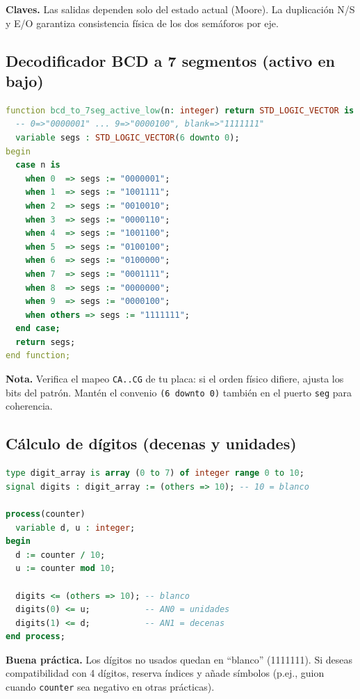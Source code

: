 \documentclass[a4paper,12pt]{article}
\begin{document}
\textbf{Claves.} Las salidas dependen solo del estado actual (Moore). La duplicación N/S y E/O garantiza consistencia física de los dos semáforos por eje.


\subsection{Decodificador BCD a 7 segmentos (activo en bajo)}

\begin{lstlisting}[language=VHDL, caption={Función BCD a 7-seg activo en bajo}, label={lst:decoder-7seg}]
function bcd_to_7seg_active_low(n: integer) return STD_LOGIC_VECTOR is
  -- 0=>"0000001" ... 9=>"0000100", blank=>"1111111"
  variable segs : STD_LOGIC_VECTOR(6 downto 0);
begin
  case n is
    when 0  => segs := "0000001";
    when 1  => segs := "1001111";
    when 2  => segs := "0010010";
    when 3  => segs := "0000110";
    when 4  => segs := "1001100";
    when 5  => segs := "0100100";
    when 6  => segs := "0100000";
    when 7  => segs := "0001111";
    when 8  => segs := "0000000";
    when 9  => segs := "0000100";
    when others => segs := "1111111";
  end case;
  return segs;
end function;
\end{lstlisting}

\textbf{Nota.} Verifica el mapeo \texttt{CA..CG} de tu placa: si el orden físico difiere, ajusta los bits del patrón. Mantén el convenio \texttt{(6 downto 0)} también en el puerto \texttt{seg} para coherencia.

\newpage


\subsection{Cálculo de dígitos (decenas y unidades)}

\begin{lstlisting}[language=VHDL, caption={Buffer de dígitos y partición decenas/unidades}, label={lst:buffer-digitos}]
type digit_array is array (0 to 7) of integer range 0 to 10;
signal digits : digit_array := (others => 10); -- 10 = blanco

process(counter)
  variable d, u : integer;
begin
  d := counter / 10;
  u := counter mod 10;

  digits <= (others => 10); -- blanco
  digits(0) <= u;           -- AN0 = unidades
  digits(1) <= d;           -- AN1 = decenas
end process;
\end{lstlisting}

\textbf{Buena práctica.} Los dígitos no usados quedan en “blanco” (1111111). Si deseas compatibilidad con 4 dígitos, reserva índices y añade símbolos (p.ej., guion cuando \texttt{counter} sea negativo en otras prácticas).
\end{document}

